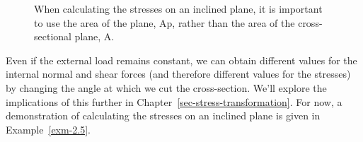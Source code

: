 \documentclass[
  letterpaper,
  DIV=11,
  numbers=noendperiod]{scrreprt}
\theoremstyle{definition}
\theoremstyle{remark}
\begin{document}
\begin{figure}


\caption{\label{fig-2.8}When calculating the stresses on an inclined
plane, it is important to use the area of the plane, Ap, rather than the
area of the cross-sectional plane, A.}

\end{figure}%

Even if the external load remains constant, we can obtain different
values for the internal normal and shear forces (and therefore different
values for the stresses) by changing the angle at which we cut the
cross-section. We'll explore the implications of this further in
Chapter~\ref{sec-stress-transformation}. For now, a demonstration of
calculating the stresses on an inclined plane is given in
Example~\ref{exm-2.5}.
\end{document}
